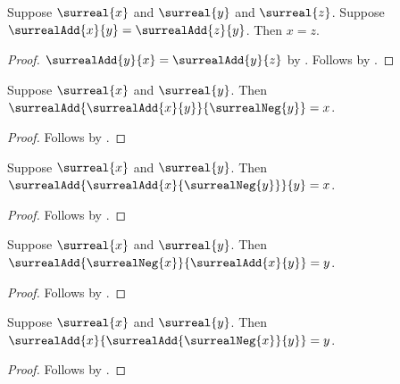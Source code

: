\begin{corollary}\label{surreal_add_cancel_right}
    Suppose $\surreal{x}$ and $\surreal{y}$ and $\surreal{z}$.
    Suppose $\surrealAdd{x}{y}=\surrealAdd{z}{y}$.
    Then $x=z$.
\end{corollary}
\begin{proof}
    $\surrealAdd{y}{x}=\surrealAdd{y}{z}$
        by .
    Follows by .
\end{proof}

\begin{corollary}\label{surreal_add_inverse_cancel_right}
    Suppose $\surreal{x}$ and $\surreal{y}$.
    Then $\surrealAdd{\surrealAdd{x}{y}}{\surrealNeg{y}}=x$.
\end{corollary}
\begin{proof}
    Follows by
        .
\end{proof}

\begin{corollary}\label{surreal_add_negated_cancel_right}
    Suppose $\surreal{x}$ and $\surreal{y}$.
    Then $\surrealAdd{\surrealAdd{x}{\surrealNeg{y}}}{y}=x$.
\end{corollary}
\begin{proof}
    Follows by
        .
\end{proof}

\begin{corollary}\label{surreal_add_inverse_cancel_left}
    Suppose $\surreal{x}$ and $\surreal{y}$.
    Then $\surrealAdd{\surrealNeg{x}}{\surrealAdd{x}{y}}=y$.
\end{corollary}
\begin{proof}
    Follows by
        .
\end{proof}

\begin{corollary}\label{surreal_add_negated_cancel_left}
    Suppose $\surreal{x}$ and $\surreal{y}$.
    Then $\surrealAdd{x}{\surrealAdd{\surrealNeg{x}}{y}}=y$.
\end{corollary}
\begin{proof}
    Follows by
        .
\end{proof}

